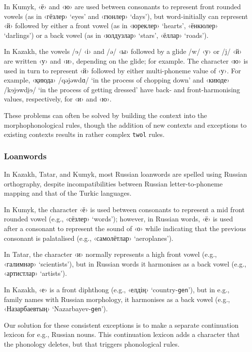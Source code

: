 \documentclass[a4paper,11pt,twocolumn]{article}
\newcommand{\tags}[1]{\texttt{#1}}
\begin{document}
In Kumyk, ‹ё› and ‹ю› are used between consonants to represent front rounded vowels (as in ‹гёзлер› `eyes' and ‹гюнлер› `days'), but word-initially can represent ‹й› followed by either a front vowel (as in ‹юреклер› `hearts', ‹ёнкюлер› `darlings') or a back vowel (as in ‹юлдузлар› `stars', ‹ёллар› `roads').

In Kazakh, the vowels /{\qipa ɘ}/ ‹і› and /ə/ ‹ы› followed by a glide /w/ ‹у› or /j/ ‹й› are written ‹у› and ‹и›, depending on the glide; for example.  The character ‹ю› is used in turn to represent ‹й› followed by either multi-phoneme value of ‹у›.  For example, ‹қиюда› /qəjəwd{\qipa ɑ}/ `in the process of chopping down' and ‹киюде› /k{\qipa ɘ}j{\qipa ɘ}wd{\qipa i̯ɘ}/ `in the process of getting dressed' have back- and front-harmonising values, respectively, for ‹и› and ‹ю›.

These problems can often be solved by building the context into the morphophonological rules, though the addition of new contexts and exceptions to existing contexts results in rather complex \texttt{twol} rules.

\subsubsection{Loanwords}
In Kazakh, Tatar, and Kumyk, most Russian loanwords are spelled using Russian orthography, despite incompatibilities between Russian letter-to-phoneme mapping and that of the Turkic languages.

In Kumyk, the character ‹ё› is used between consonants to represent a mid front rounded vowel (e.g., ‹сёзлер› `words'); however, in Russian words, ‹ё› is used after a consonant to represent the sound of ‹о› while indicating that the previous consonant is palatalised (e.g., ‹самолётлар› `aeroplanes').

In Tatar, the character ‹и› normally represents a high front vowel (e.g., ‹галимнәр› `scientists'), but in Russian words it harmonises as a back vowel (e.g., ‹артистлар› `artists').

In Kazakh, ‹е› is a front diphthong (e.g., ‹елдің› `country-\tags{gen}'), but in e.g., family names with Russian morphology, it harmonises as a back vowel (e.g., ‹Назарбаевтың› `Nazarbayev-\tags{gen}').

Our solution for these consistent exceptions is to make a separate continuation lexicon for e.g., Russian nouns.  This continuation lexicon adds a character that the phonology deletes, but that triggers phonological rules.
\end{document}
